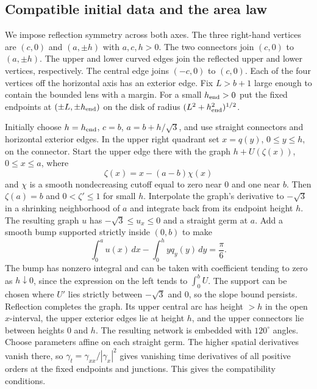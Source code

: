 \subsection{Compatible initial data and the area law}

We impose reflection symmetry across both axes. The three right-hand
vertices are \((c,0)\) and \((a,\pm h)\) with \(a,c,h>0\). The two
connectors join \((c,0)\) to \((a,\pm h)\). The upper and lower
curved edges join the reflected upper and lower vertices, respectively.
The central edge joins \((-c,0)\) to \((c,0)\). Each of the four
vertices off the horizontal axis has an exterior edge. Fix \(L>b+1\)
large enough to contain the bounded lens with a margin. For a small
\(h_{\rm end}>0\) put the fixed endpoints at \((\pm L,\pm h_{\rm end})\)
on the disk of radius \((L^2+h_{\rm end}^2)^{1/2}\).

Initially choose \(h=h_{\rm end}\), \(c=b\), \(a=b+h/\sqrt3\), and use
straight connectors and horizontal exterior edges. In the upper right
quadrant set \(x=q(y)\), \(0\le y\le h\), on the connector. Start the
upper edge there with the graph \(h+U(\zeta(x))\), \(0\le x\le a\),
where
\[
 \zeta(x)=x-(a-b)\chi(x)
\]
and \(\chi\) is a smooth nondecreasing cutoff equal to zero near \(0\)
and one near \(b\). Then \(\zeta(a)=b\) and \(0<\zeta'\le1\) for small
\(h\). Interpolate the graph's derivative to \(-\sqrt3\) in a shrinking
neighborhood of \(a\) and integrate back from its endpoint height
\(h\). The resulting graph \(u\) has \(-\sqrt3\le u_x\le0\) and a
straight germ at \(a\). Add a smooth bump supported strictly inside
\((0,b)\) to make
\begin{equation}
 \int_0^a u(x)\,dx-\int_0^h yq_y(y)\,dy=\frac{\pi}{6}.
 \label{eq:initial-area}
\end{equation}
The bump has nonzero integral and can be taken with coefficient tending
to zero as \(h\downarrow0\), since the expression on the left tends
to \(\int_0^b U\). The support can be chosen where \(U'\) lies strictly
between \(-\sqrt3\) and \(0\), so the slope bound persists. Reflection
completes the graph. Its upper central arc has height \(>h\) in the
open \(x\)-interval, the upper exterior edges lie at height \(h\),
and the upper connectors lie between heights \(0\) and \(h\).
The resulting network is embedded with \(120^\circ\) angles. Choose
parameters affine on each straight germ. The higher spatial derivatives
vanish there, so \(\gamma_t=\gamma_{xx}/|\gamma_x|^2\) gives vanishing
time derivatives of all positive orders at the fixed endpoints and
junctions. This gives the compatibility conditions.

